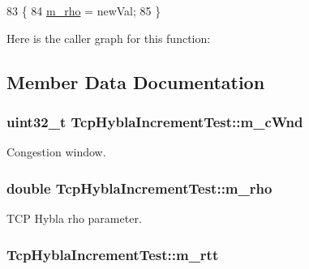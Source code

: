 \begin{DoxyCode}
83 \{
84   \hyperlink{classTcpHyblaIncrementTest_afbdfbaf9911a29b5819f548c1195f5e0}{m\_rho} = newVal;
85 \}
\end{DoxyCode}


Here is the caller graph for this function\+:




\subsection{Member Data Documentation}
\subsubsection[{\texorpdfstring{m\+\_\+c\+Wnd}{m_cWnd}}]{\setlength{\rightskip}{0pt plus 5cm}uint32\+\_\+t Tcp\+Hybla\+Increment\+Test\+::m\+\_\+c\+Wnd\hspace{0.3cm}{\ttfamily [private]}}\hypertarget{classTcpHyblaIncrementTest_a1cc57b61ad36bc6ac3e30c9d856ac7c3}{}\label{classTcpHyblaIncrementTest_a1cc57b61ad36bc6ac3e30c9d856ac7c3}


Congestion window. 

\subsubsection[{\texorpdfstring{m\+\_\+rho}{m_rho}}]{\setlength{\rightskip}{0pt plus 5cm}double Tcp\+Hybla\+Increment\+Test\+::m\+\_\+rho\hspace{0.3cm}{\ttfamily [private]}}\hypertarget{classTcpHyblaIncrementTest_afbdfbaf9911a29b5819f548c1195f5e0}{}\label{classTcpHyblaIncrementTest_afbdfbaf9911a29b5819f548c1195f5e0}


T\+CP Hybla rho parameter. 

\subsubsection[{\texorpdfstring{m\+\_\+rtt}{m_rtt}}]{ Tcp\+Hybla\+Increment\+Test\+::m\+\_\+rtt\hspace{0.3cm}{\ttfamily [private]}}\hypertarget{classTcpHyblaIncrementTest_ad472aca77f133ebf3dd2034d30e0148e}{}\label{classTcpHyblaIncrementTest_ad472aca77f133ebf3dd2034d30e0148e}


